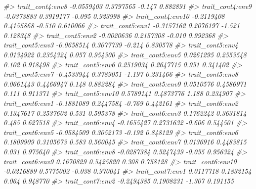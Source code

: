 \documentclass[
]{article}
\newenvironment{Shaded}{\begin{snugshade}}{\end{snugshade}}
\newcommand{\CommentTok}[1]{\textcolor[rgb]{0.56,0.35,0.01}{\textit{#1}}}
\begin{document}
\begin{Shaded}
\begin{Highlighting}[]
\CommentTok{\#\textgreater{} trait\_cont4:env8              {-}0.0559403  0.3797565  {-}0.147 0.882891    }
\CommentTok{\#\textgreater{} trait\_cont4:env9              {-}0.0373883  0.3919177  {-}0.095 0.923998    }
\CommentTok{\#\textgreater{} trait\_cont4:env10             {-}0.2119408  0.4155868  {-}0.510 0.610066    }
\CommentTok{\#\textgreater{} trait\_cont5:env1              {-}0.3157162  0.2076197  {-}1.521 0.128348    }
\CommentTok{\#\textgreater{} trait\_cont5:env2              {-}0.0020636  0.2157308  {-}0.010 0.992368    }
\CommentTok{\#\textgreater{} trait\_cont5:env3              {-}0.0658514  0.3077739  {-}0.214 0.830578    }
\CommentTok{\#\textgreater{} trait\_cont5:env4               0.0134922  0.2354324   0.057 0.954300    }
\CommentTok{\#\textgreater{} trait\_cont5:env5               0.0261295  0.2553548   0.102 0.918498    }
\CommentTok{\#\textgreater{} trait\_cont5:env6               0.2519034  0.2647715   0.951 0.341402    }
\CommentTok{\#\textgreater{} trait\_cont5:env7              {-}0.4533944  0.3789051  {-}1.197 0.231466    }
\CommentTok{\#\textgreater{} trait\_cont5:env8               0.0661443  0.4466947   0.148 0.882284    }
\CommentTok{\#\textgreater{} trait\_cont5:env9               0.0510576  0.4586971   0.111 0.911371    }
\CommentTok{\#\textgreater{} trait\_cont5:env10              0.5789141  0.4873776   1.188 0.234907    }
\CommentTok{\#\textgreater{} trait\_cont6:env1              {-}0.1881089  0.2447584  {-}0.769 0.442161    }
\CommentTok{\#\textgreater{} trait\_cont6:env2               0.1347617  0.2537602   0.531 0.595378    }
\CommentTok{\#\textgreater{} trait\_cont6:env3               0.1762242  0.3631814   0.485 0.627518    }
\CommentTok{\#\textgreater{} trait\_cont6:env4              {-}0.1655427  0.2731632  {-}0.606 0.544501    }
\CommentTok{\#\textgreater{} trait\_cont6:env5              {-}0.0584509  0.3052173  {-}0.192 0.848129    }
\CommentTok{\#\textgreater{} trait\_cont6:env6               0.1809909  0.3105673   0.583 0.560045    }
\CommentTok{\#\textgreater{} trait\_cont6:env7               0.0136916  0.4483815   0.031 0.975640    }
\CommentTok{\#\textgreater{} trait\_cont6:env8              {-}0.0287384  0.5247439  {-}0.055 0.956324    }
\CommentTok{\#\textgreater{} trait\_cont6:env9               0.1670829  0.5425820   0.308 0.758128    }
\CommentTok{\#\textgreater{} trait\_cont6:env10             {-}0.0216889  0.5775002  {-}0.038 0.970041    }
\CommentTok{\#\textgreater{} trait\_cont7:env1               0.0117718  0.1832154   0.064 0.948770    }
\CommentTok{\#\textgreater{} trait\_cont7:env2              {-}0.2494385  0.1908231  {-}1.307 0.191155    }

\end{Highlighting}
\end{Shaded}
\end{document}
